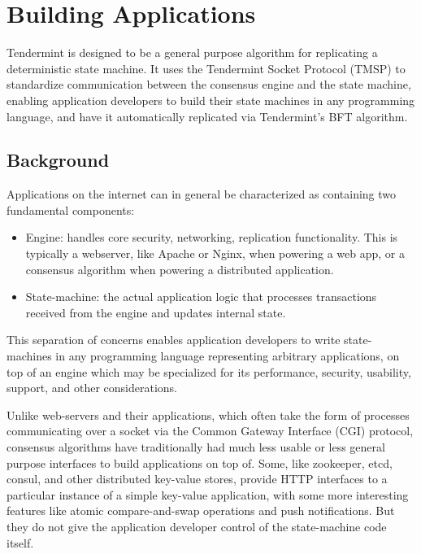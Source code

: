 \chapter{Building Applications}
\label{ch:apps}

Tendermint is designed to be a general purpose algorithm for replicating a deterministic state machine.
It uses the Tendermint Socket Protocol (TMSP) to standardize communication between the consensus engine and the state machine,
enabling application developers to build their state machines in any programming language, 
and have it automatically replicated via Tendermint's BFT algorithm.

\section{Background}

Applications on the internet can in general be characterized as containing two fundamental components:

\begin{itemize}
\item{Engine: handles core security, networking, replication
    functionality. This is typically a webserver, like Apache or Nginx, when powering a web app, or a consensus algorithm when powering a distributed application.}
\item{State-machine: the actual application logic that processes transactions received from the engine and updates internal state.}
\end{itemize}

This separation of concerns enables application developers to write state-machines in any programming language representing arbitrary applications,
on top of an engine which may be specialized for its performance, security, usability, support, and other considerations.

Unlike web-servers and their applications, which often take the form of processes communicating over a socket via the Common Gateway Interface (CGI) protocol,
consensus algorithms have traditionally had much less usable or less general purpose interfaces to build applications on top of.
Some, like zookeeper, etcd, consul, and other distributed key-value stores, 
provide HTTP interfaces to a particular instance of a simple key-value application, 
with some more interesting features like atomic compare-and-swap operations and push notifications.
But they do not give the application developer control of the state-machine code itself.

